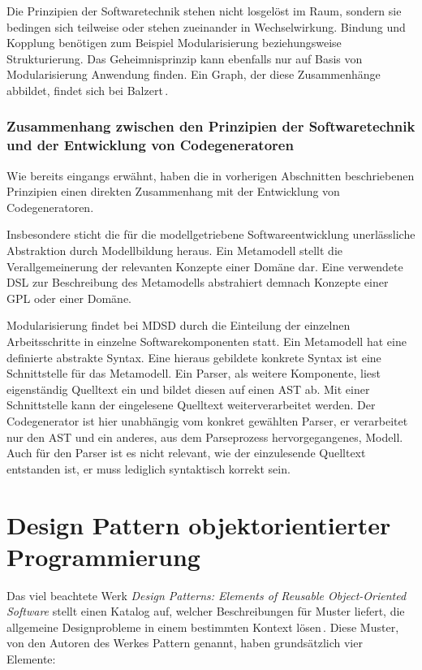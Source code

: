 \documentclass[12pt,oneside,a4paper,parskip]{scrbook}
\begin{document}
Die Prinzipien der Softwaretechnik stehen nicht losgelöst im Raum, sondern sie bedingen sich teilweise oder stehen zueinander in Wechselwirkung. Bindung und Kopplung benötigen zum Beispiel Modularisierung beziehungsweise Strukturierung. Das Geheimnisprinzip kann ebenfalls nur auf Basis von Modularisierung Anwendung finden. Ein Graph, der diese Zusammenhänge abbildet, findet sich bei Balzert\,\cite[S. 49]{balzert2009a}.

\subsubsection{Zusammenhang zwischen den Prinzipien der Softwaretechnik und der Entwicklung von Codegeneratoren}

Wie bereits eingangs erwähnt, haben die in vorherigen Abschnitten beschriebenen Prinzipien einen direkten Zusammenhang mit der Entwicklung von Codegeneratoren.

Insbesondere sticht die für die modellgetriebene Softwareentwicklung unerlässliche Abstraktion durch Modellbildung heraus. Ein Metamodell stellt die Verallgemeinerung der relevanten Konzepte einer Domäne dar. Eine verwendete DSL zur Beschreibung des Metamodells abstrahiert demnach Konzepte einer GPL oder einer Domäne.

Modularisierung findet bei MDSD durch die Einteilung der einzelnen Arbeitsschritte in einzelne Softwarekomponenten statt. Ein Metamodell hat eine definierte abstrakte Syntax. Eine hieraus gebildete konkrete Syntax ist eine Schnittstelle für das Metamodell. Ein Parser, als weitere Komponente, liest eigenständig Quelltext ein und bildet diesen auf einen AST ab. Mit einer Schnittstelle kann der eingelesene Quelltext weiterverarbeitet werden. Der Codegenerator ist hier unabhängig vom konkret gewählten Parser, er verarbeitet nur den AST und ein anderes, aus dem Parseprozess hervorgegangenes, Modell. Auch für den Parser ist es nicht relevant, wie der einzulesende Quelltext entstanden ist, er muss lediglich syntaktisch korrekt sein.

\section{Design Pattern objektorientierter Programmierung}

Das viel beachtete Werk \textit{Design Patterns: Elements of Reusable Object-Oriented Software} stellt einen Katalog auf, welcher Beschreibungen für Muster liefert, die allgemeine Designprobleme in einem bestimmten Kontext lösen\,\cite{gamma1995}. Diese Muster, von den Autoren des Werkes Pattern genannt, haben grundsätzlich vier Elemente:
\end{document}
